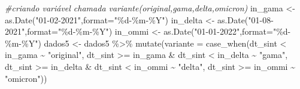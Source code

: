 \documentclass[
]{article}
\newenvironment{Shaded}{\begin{snugshade}}{\end{snugshade}}
\newcommand{\AttributeTok}[1]{\textcolor[rgb]{0.77,0.63,0.00}{#1}}
\newcommand{\CommentTok}[1]{\textcolor[rgb]{0.56,0.35,0.01}{\textit{#1}}}
\newcommand{\FunctionTok}[1]{\textcolor[rgb]{0.00,0.00,0.00}{#1}}
\newcommand{\NormalTok}[1]{#1}
\newcommand{\OtherTok}[1]{\textcolor[rgb]{0.56,0.35,0.01}{#1}}
\newcommand{\SpecialCharTok}[1]{\textcolor[rgb]{0.00,0.00,0.00}{#1}}
\newcommand{\StringTok}[1]{\textcolor[rgb]{0.31,0.60,0.02}{#1}}
\begin{document}
\begin{Shaded}
\begin{Highlighting}[]
\CommentTok{\#criando variável chamada variante(original,gama,delta,omicron)}
\NormalTok{in\_gama }\OtherTok{\textless{}{-}} \FunctionTok{as.Date}\NormalTok{(}\StringTok{"01{-}02{-}2021"}\NormalTok{,}\AttributeTok{format=}\StringTok{"\%d{-}\%m{-}\%Y"}\NormalTok{)}
\NormalTok{in\_delta }\OtherTok{\textless{}{-}} \FunctionTok{as.Date}\NormalTok{(}\StringTok{"01{-}08{-}2021"}\NormalTok{,}\AttributeTok{format=}\StringTok{"\%d{-}\%m{-}\%Y"}\NormalTok{)}
\NormalTok{in\_ommi }\OtherTok{\textless{}{-}} \FunctionTok{as.Date}\NormalTok{(}\StringTok{"01{-}01{-}2022"}\NormalTok{,}\AttributeTok{format=}\StringTok{"\%d{-}\%m{-}\%Y"}\NormalTok{)}
\NormalTok{dados5 }\OtherTok{\textless{}{-}}\NormalTok{ dados5 }\SpecialCharTok{\%\textgreater{}\%} 
  \FunctionTok{mutate}\NormalTok{(}\AttributeTok{variante =} \FunctionTok{case\_when}\NormalTok{(dt\_sint }\SpecialCharTok{\textless{}}\NormalTok{ in\_gama }\SpecialCharTok{\textasciitilde{}} \StringTok{"original"}\NormalTok{,}
\NormalTok{                              dt\_sint }\SpecialCharTok{\textgreater{}=}\NormalTok{ in\_gama }\SpecialCharTok{\&}\NormalTok{ dt\_sint }\SpecialCharTok{\textless{}}\NormalTok{ in\_delta }\SpecialCharTok{\textasciitilde{}} \StringTok{"gama"}\NormalTok{,}
\NormalTok{                              dt\_sint }\SpecialCharTok{\textgreater{}=}\NormalTok{ in\_delta }\SpecialCharTok{\&}\NormalTok{ dt\_sint }\SpecialCharTok{\textless{}}\NormalTok{ in\_ommi }\SpecialCharTok{\textasciitilde{}} \StringTok{"delta"}\NormalTok{,}
\NormalTok{                              dt\_sint }\SpecialCharTok{\textgreater{}=}\NormalTok{ in\_ommi }\SpecialCharTok{\textasciitilde{}} \StringTok{"omicron"}\NormalTok{))}
\end{Highlighting}
\end{Shaded}
\end{document}
